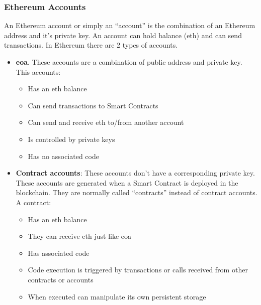 \documentclass[a4paper, 12pt]{article} %
\begin{document}
        \subsubsection{Ethereum Accounts}
            An Ethereum account or simply an “account” is the combination of an Ethereum address and it’s private key. An account can hold balance (\acrlong{eth}) and can send transactions. In Ethereum there are 2 types of accounts.
            \begin{itemize}
                \item \textbf{\acrfull{eoa}}. These accounts are a combination of public address and private key. This accounts:
                \begin{itemize}
                    \item Has an \acrlong{eth} balance
                    \item Can send transactions to Smart Contracts
                    \item Can send and receive \acrlong{eth} to/from another account
                    \item Is controlled by private keys
                    \item Has no associated code
                \end{itemize}
                \item \textbf{Contract accounts}: These accounts don’t have a corresponding private key. These accounts are generated when a Smart Contract is deployed in the blockchain. They are normally called “contracts” instead of contract accounts. A contract:
                \begin{itemize}
                    \item Has an \acrlong{eth} balance
                    \item They can receive \acrlong{eth} just like \acrshort{eoa}
                    \item Has associated code
                    \item Code execution is triggered by transactions or calls received from other contracts or accounts
                    \item When executed can manipulate its own persistent storage
                \end{itemize}
            \end{itemize}
        
\end{document}
